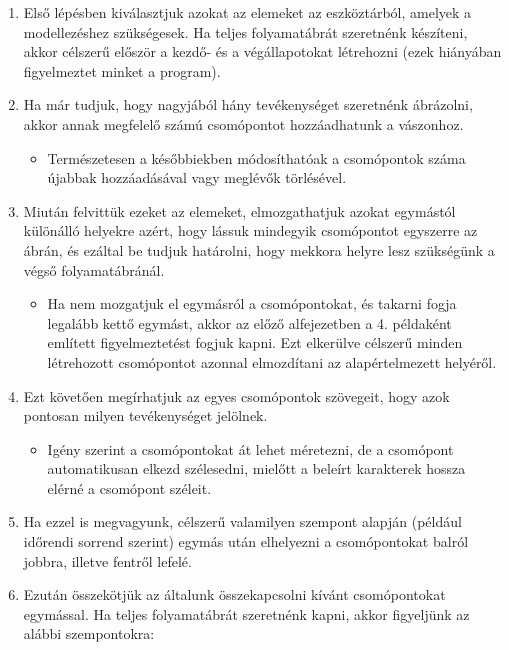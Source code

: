 \begin{enumerate}
\item Első lépésben kiválasztjuk azokat az elemeket az eszköztárból, amelyek a modellezéshez szükségesek. Ha teljes folyamatábrát szeretnénk készíteni, akkor célszerű először a kezdő- és a végállapotokat létrehozni (ezek hiányában figyelmeztet minket a program).
\item Ha már tudjuk, hogy nagyjából hány tevékenységet szeretnénk ábrázolni, akkor annak megfelelő számú csomópontot hozzáadhatunk a vászonhoz.

\begin{itemize}
\item Természetesen a későbbiekben módosíthatóak a csomópontok száma újabbak hozzáadásával vagy meglévők törlésével.
\end{itemize}

\item Miután felvittük ezeket az elemeket, elmozgathatjuk azokat egymástól különálló helyekre azért, hogy lássuk mindegyik csomópontot egyszerre az ábrán, és ezáltal be tudjuk határolni, hogy mekkora helyre lesz szükségünk a végső folyamatábránál.

\begin{itemize}
\item Ha nem mozgatjuk el egymásról a csomópontokat, és takarni fogja legalább kettő egymást, akkor az előző alfejezetben a 4. példaként említett figyelmeztetést fogjuk kapni. Ezt elkerülve célszerű minden létrehozott csomópontot azonnal elmozdítani az alapértelmezett helyéről.
\end{itemize}

\item Ezt követően megírhatjuk az egyes csomópontok szövegeit, hogy azok pontosan milyen tevékenységet jelölnek.

\begin{itemize}
\item Igény szerint a csomópontokat át lehet méretezni, de a csomópont automatikusan elkezd szélesedni, mielőtt a beleírt karakterek hossza elérné a csomópont széleit.
\end{itemize}

\item Ha ezzel is megvagyunk, célszerű valamilyen szempont alapján (például időrendi sorrend szerint) egymás után elhelyezni a csomópontokat balról jobbra, illetve fentről lefelé.
\item Ezután összekötjük az általunk összekapcsolni kívánt csomópontokat egymással. Ha teljes folyamatábrát szeretnénk kapni, akkor figyeljünk az alábbi szempontokra:


\end{enumerate}
